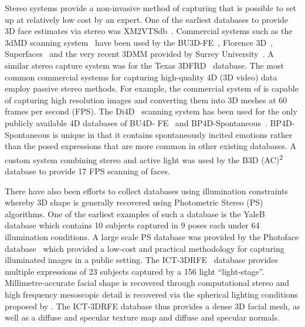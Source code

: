 Stereo systems provide a non-invasive method of capturing that is possible to
set up at relatively low cost by an expert. One of the earliest databases to
provide 3D face estimates via stereo was XM2VTSdb~\cite{messer1999xm2vtsdb}.
Commercial systems such as the 3dMD scanning system~\cite{3dmd} have been used
by the BU3D-FE~\cite{Yin:2006cc}, Florence 3D~\cite{bagdanov2011florence},
Superfaces~\cite{berretti2012superfaces} and the very recent 3DMM provided by
Surrey University~\cite{Huber:F5Dca9zy}. A similar stereo capture system was
for the Texas 3DFRD~\cite{gupta2010anthropometric} database. The most common
commercial systems for capturing high-quality 4D (3D video) data employ passive
stereo methods. For example, the commercial
system of \citet{di4d} is capable of capturing high resolution images and
converting them into 3D meshes at 60 frames per second (FPS).
The Di4D~\cite{di4d} scanning system
has been used for the only publicly available 4D databases of BU4D-
FE~\cite{yin2008high} and BP4D-Spontaneous~\cite{Zhang:2014id}. BP4D-Spontaneous
is unique in that it contains spontaneously incited emotions rather than the
posed expressions that are more common in other existing databases. A custom
system combining stereo and active light was used by the B3D
(AC)\textsuperscript{2}~\cite{weise2007fast,fanelli2013random} database to
provide 17 FPS scanning of faces.

There have also been efforts to collect databases using illumination constraints
whereby 3D shape is generally recovered using
Photometric Stereo (PS)~\cite{woodham1980photometric}
algorithms. One of the earliest examples of such a database is the
YaleB~\cite{georghiades2001fromfew} database which contains 10 subjects captured in
9 poses each under 64 illumination conditions. A large scale PS database was
provided by the Photoface database~\cite{zafeiriou2013photoface} which provided a low-cost
and practical methodology for capturing illuminated images in a public setting.
The ICT-3DRFE~\cite{stratou2012exploring} database provides multiple expressions
of 23 subjects captured by a 156 light ``light-stage''. Millimetre-accurate
facial shape is recovered through computational stereo and high frequency
mesoscopic detail is recovered via the spherical lighting conditions proposed
by \citet{ma2007rapid}. The ICT-3DRFE database thus provides a dense
3D facial mesh, as well as a diffuse and specular texture map and diffuse and
specular normals.
